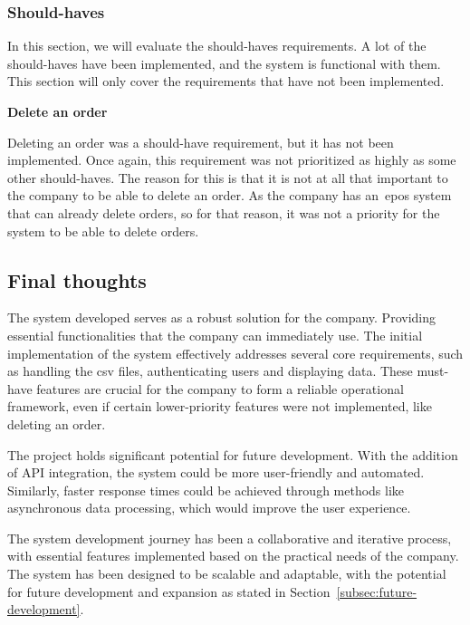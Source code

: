 \subsubsection{Should-haves}\label{subsubsec:should-haves}

In this section, we will evaluate the should-haves requirements.
A lot of the should-haves have been implemented, and the system is functional with them.
This section will only cover the requirements that have not been implemented.
\newline

\noindent
\textbf{Delete an order}\label{text:delete-an-order}

\noindent
Deleting an order was a should-have requirement, but it has not been implemented.
Once again, this requirement was not prioritized as highly as some other should-haves.
The reason for this is that it is not at all that important to the company to be able to delete an order.
As the company has an~\acrshort{epos} system that can already delete orders, so for that reason, it was not a priority
for the system to be able to delete orders.

\subsection{Final thoughts}\label{subsec:final-thoughts}

The system developed serves as a robust solution for the company.
Providing essential functionalities that the company can immediately use.
The initial implementation of the system effectively addresses several core requirements, such as handling the
csv files, authenticating users and displaying data.
These must-have features are crucial for the company to form a reliable operational framework, even if certain
lower-priority features were not implemented, like deleting an order.

The project holds significant potential for future development.
With the addition of API integration, the system could be more user-friendly and automated.
Similarly, faster response times could be achieved through methods like asynchronous data processing, which would
improve the user experience.

The system development journey has been a collaborative and iterative process, with essential features implemented
based on the practical needs of the company.
The system has been designed to be scalable and adaptable, with the potential for future development and expansion as
stated in Section~\ref{subsec:future-development}.
